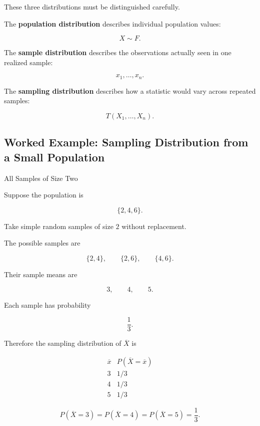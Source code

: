 These three distributions must be distinguished carefully.

The \textbf{population distribution} describes individual population
values:

\[
\boxed{
X\sim F.
}
\]

The \textbf{sample distribution} describes the observations actually
seen in one realized sample:

\[
\boxed{
x_1,\ldots,x_n.
}
\]

The \textbf{sampling distribution} describes how a statistic would vary
across repeated samples:

\[
\boxed{
T(X_1,\ldots,X_n).
}
\]

\subsection{Worked Example: Sampling Distribution from a Small Population}
\label{subsec:worked-small-population-sampling-distribution}

\begin{workedexamplebox}{All Samples of Size Two}

Suppose the population is

\[
\{2,4,6\}.
\]

Take simple random samples of size \(2\) without replacement.

The possible samples are

\[
\{2,4\},
\qquad
\{2,6\},
\qquad
\{4,6\}.
\]

Their sample means are

\[
3,\qquad4,\qquad5.
\]

Each sample has probability

\[
\frac13.
\]

Therefore the sampling distribution of \(\overline{X}\) is

\[
\begin{array}{c|c}
\overline{x} & P(\overline{X}=\overline{x})\\
\hline
3 & 1/3\\
4 & 1/3\\
5 & 1/3
\end{array}
\]

\begin{answerbox}
\[
\boxed{
P(\overline{X}=3)
=
P(\overline{X}=4)
=
P(\overline{X}=5)
=
\frac13.
}
\]
\end{answerbox}

\end{workedexamplebox}

